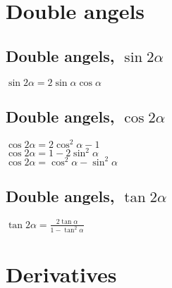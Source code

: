 \documentclass[a4paper, 10pt]{scrartcl}
\begin{document}
\section*{Double angels}

\subsection*{Double angels, $\sin{2\alpha}$}
$\sin{2\alpha} = 2\sin{\alpha}\cos{\alpha}$\\

\subsection*{Double angels, $\cos{2\alpha}$}
$\cos{2\alpha} = 2\cos^{2}{\alpha} - 1$\\
$\cos{2\alpha} = 1 - 2\sin^{2}{\alpha}$\\
$\cos{2\alpha} = \cos^{2}{\alpha} - \sin^{2}{\alpha}$\\

\subsection*{Double angels, $\tan{2\alpha}$}
$\tan{2\alpha} = \frac{2\tan{\alpha}}{1 - \tan^{2}{\alpha}}$\\

\section*{Derivatives}
\end{document}
